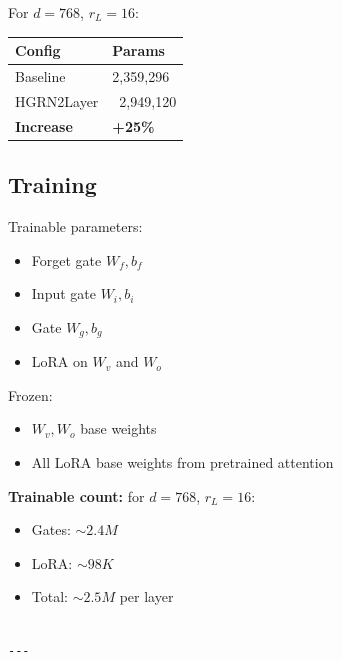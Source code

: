 For $d = 768$, $r_L = 16$:

\begin{table}[H]
\centering
\small
\begin{tabular}{ll}
\toprule
\textbf{Config} & \textbf{Params} \\
\midrule
Baseline & 2,359,296 \\
HGRN2Layer & ~2,949,120 \\
\textbf{Increase} & \textbf{+25\%} \\
\bottomrule
\end{tabular}
\end{table}

\subsection{Training}

Trainable parameters:
\begin{itemize}
\item Forget gate $W_f, b_f$
\item Input gate $W_i, b_i$
\item Gate $W_g, b_g$
\item LoRA on $W_v$ and $W_o$

\end{itemize}
Frozen:
\begin{itemize}
\item $W_v, W_o$ base weights
\item All LoRA base weights from pretrained attention

\end{itemize}
\textbf{Trainable count:} for $d = 768$, $r_L = 16$:
\begin{itemize}
\item Gates: $\sim 2.4M$
\item LoRA: $\sim 98K$
\item Total: $\sim 2.5M$ per layer
\end{itemize}
\begin{lstlisting}

---
\end{lstlisting}